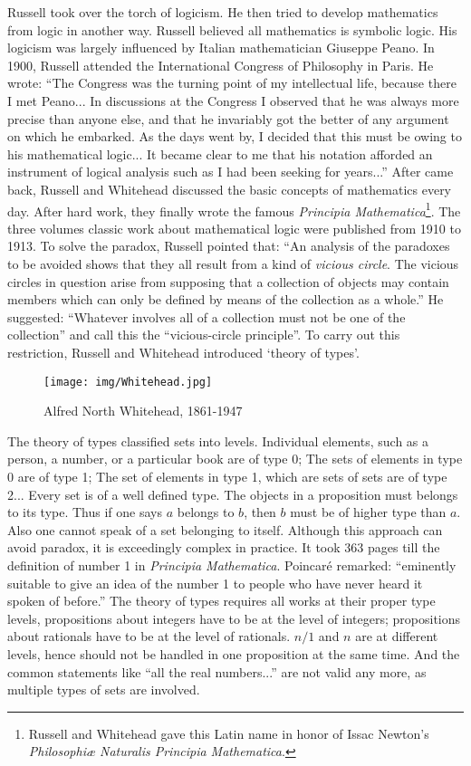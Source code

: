 \documentclass[b5paper]{article}
\begin{document}
Russell took over the torch of logicism. He then tried to develop mathematics from logic in another way. Russell believed all mathematics is symbolic logic. His logicism was largely influenced by Italian mathematician Giuseppe Peano. In 1900, Russell attended the International Congress of Philosophy in Paris. He wrote: ``The Congress was the turning point of my intellectual life, because there I met Peano... In discussions at the Congress I observed that he was always more precise than anyone else, and that he invariably got the better of any argument on which he embarked. As the days went by, I decided that this must be owing to his mathematical logic... It became clear to me that his notation afforded an instrument of logical analysis such as I had been seeking for years...'' After came back, Russell and Whitehead discussed the basic concepts of mathematics every day. After hard work, they finally wrote the famous {\em Principia Mathematica}\footnote{Russell and Whitehead gave this Latin name in honor of Issac Newton's {\em Philosophiæ Naturalis Principia Mathematica}.}. The three volumes classic work about mathematical logic were published from 1910 to 1913. To solve the paradox, Russell pointed that: ``An analysis of the paradoxes to be avoided shows that they all result from a kind of {\em vicious circle}. The vicious circles in question arise from supposing that a collection of objects may contain members which can only be defined by means of the collection as a whole.'' He suggested: ``Whatever involves all of a collection must not be one of the collection'' and call this the ``vicious-circle principle''. To carry out this restriction, Russell and Whitehead introduced `theory of types'.

\begin{wrapfigure}{R}{0.4\textwidth}
 \centering
 \texttt{[image: img/Whitehead.jpg]}
 \captionsetup{labelformat=empty}
 \caption{Alfred North Whitehead, 1861-1947}
 \label{fig:Whitehead}
\end{wrapfigure}

The theory of types classified sets into levels. Individual elements, such as a person, a number, or a particular book are of type 0; The sets of elements in type 0 are of type 1; The set of elements in type 1, which are sets of sets are of type 2... Every set is of a well defined type. The objects in a proposition must belongs to its type. Thus if one says $a$ belongs to $b$, then $b$ must be of higher type than $a$. Also one cannot speak of a set belonging to itself. Although this approach can avoid paradox, it is exceedingly complex in practice. It took 363 pages till the definition of number 1 in {\em Principia Mathematica}. Poincaré remarked: ``eminently suitable to give an idea of the number 1 to people who have never heard it spoken of before.'' The theory of types requires all works at their proper type levels, propositions about integers have to be at the level of integers; propositions about rationals have to be at the level of rationals. $n/1$ and $n$ are at different levels, hence should not be handled in one proposition at the same time. And the common statements like ``all the real numbers...'' are not valid any more, as multiple types of sets are involved.
\end{document}
